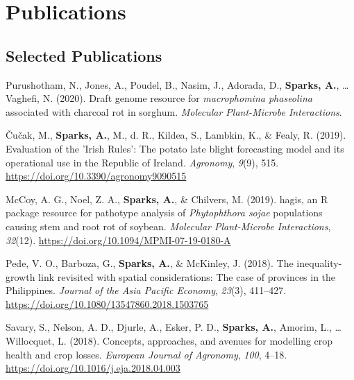 \documentclass[11pt, a4paper]{awesome-cv}
\begin{document}
\hypertarget{publications}{%
\section{Publications}\label{publications}}

\hypertarget{selected-publications}{%
\subsection{Selected Publications}\label{selected-publications}}

\begingroup
\setlength{\parindent}{-0.5in}
\setlength{\leftskip}{0.5in}

\hypertarget{refs_articles}{}
\leavevmode\hypertarget{ref-Purushotham2020}{}%
Purushotham, N., Jones, A., Poudel, B., Nasim, J., Adorada, D., \textbf{Sparks, A.}, \ldots{} Vaghefi, N. (2020). Draft genome resource for \emph{macrophomina phaseolina} associated with charcoal rot in sorghum. \emph{Molecular Plant-Microbe Interactions}.

\leavevmode\hypertarget{ref-cucak2019evaluation}{}%
Čučak, M., \textbf{Sparks, A.}, M., d. R., Kildea, S., Lambkin, K., \& Fealy, R. (2019). Evaluation of the 'Irish Rules': The potato late blight forecasting model and its operational use in the Republic of Ireland. \emph{Agronomy}, \emph{9}(9), 515. \url{https://doi.org/10.3390/agronomy9090515}

\leavevmode\hypertarget{ref-mccoy2019hagis}{}%
McCoy, A. G., Noel, Z. A., \textbf{Sparks, A.}, \& Chilvers, M. (2019). hagis, an R package resource for pathotype analysis of \emph{Phytophthora sojae} populations causing stem and root rot of soybean. \emph{Molecular Plant-Microbe Interactions}, \emph{32}(12). \url{https://doi.org/10.1094/MPMI-07-19-0180-A}

\leavevmode\hypertarget{ref-doi:10.1080ux2f13547860.2018.1503765}{}%
Pede, V. O., Barboza, G., \textbf{Sparks, A.}, \& McKinley, J. (2018). The inequality-growth link revisited with spatial considerations: The case of provinces in the Philippines. \emph{Journal of the Asia Pacific Economy}, \emph{23}(3), 411--427. \url{https://doi.org/10.1080/13547860.2018.1503765}

\leavevmode\hypertarget{ref-Savary2018}{}%
Savary, S., Nelson, A. D., Djurle, A., Esker, P. D., \textbf{Sparks, A.}, Amorim, L., \ldots{} Willocquet, L. (2018). Concepts, approaches, and avenues for modelling crop health and crop losses. \emph{European Journal of Agronomy}, \emph{100}, 4--18. \url{https://doi.org/10.1016/j.eja.2018.04.003}
\end{document}
